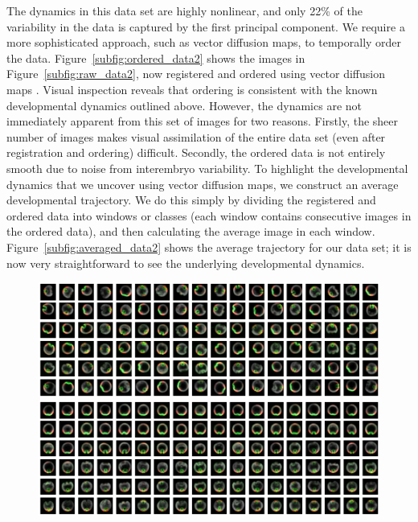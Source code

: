 \documentclass{pnastwo}
\begin{document}
\begin{article}
The dynamics in this data set are highly nonlinear, and only 22\% of the variability in the data is captured by the first principal component.
%
We require a more sophisticated approach, such as vector diffusion maps, to temporally order the data.
%
Figure~\ref{subfig:ordered_data2} shows the images in Figure~\ref{subfig:raw_data2}, now registered and ordered using vector diffusion maps \cite{singer2012vector}.
%
Visual inspection reveals that ordering is consistent with the known developmental dynamics outlined above.
%
However, the dynamics are not immediately apparent from this set of images for two reasons.
%
Firstly, the sheer number of images makes visual assimilation of the entire data set (even after registration and ordering) difficult.
%
Secondly, the ordered data is not entirely smooth due to noise from interembryo variability.
%
To highlight the developmental dynamics that we uncover using vector diffusion maps, we construct an average developmental trajectory.
%
We do this simply by dividing the registered and ordered data into windows or classes (each window contains consecutive images in the ordered data), and then calculating the average image in each window.
%
Figure~\ref{subfig:averaged_data2} shows the average trajectory for our data set; it is now very straightforward to see the underlying developmental dynamics.

\begin{figure}[t]
\includegraphics[width=16.8cm]{raw_data2}

\vspace{0.2cm}
\includegraphics[width=16.8cm]{VDM_ordered}


\end{figure}
\end{article}
\end{document}
